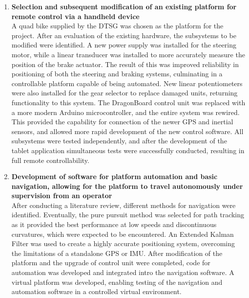 \documentclass[main.tex]{subfiles}
\begin{document}
\begin{enumerate}
\item \textbf{Selection and subsequent modification of an existing platform for remote control via a handheld device}\\ 
A quad bike supplied by the DTSG was chosen as the platform for the project. 
After an evaluation of the existing hardware, the subsystems to be modified were identified. 
A new power supply was installed for the steering motor, while a linear transducer was installed to more accurately measure the position of the brake actuator. 
The result of this was improved reliability in positioning of both the steering and braking systems, culminating in a controllable platform capable of being automated.
New linear potentiometers were also installed for the gear selector to replace damaged units, returning functionality to this system. 
The DragonBoard control unit was replaced with a more modern Arduino microcontroller, and the entire system was rewired. 
This provided the capability for connection of the newer GPS and inertial sensors, and allowed more rapid development of the new control software.
All subsystems were tested independently, and after the development of the tablet application simultaneous tests were successfully conducted, resulting in full remote controllability.

 

\item \textbf{Development of software for platform automation and basic navigation, allowing for the platform to travel autonomously under supervision from an operator}\\ 
After conducting a literature review, different methods for navigation were identified. Eventually, the pure pursuit method was selected for path tracking as it provided the best performance at low speeds and discontinuous curvatures, which were expected to be encountered. An Extended Kalman Filter was used to create a highly accurate positioning system, overcoming the limitations of a standalone GPS or IMU. After modification of the platform and the upgrade of control unit were completed, code for automation was developed and integrated intro the navigation software. A virtual platform was developed, enabling testing of the navigation and automation software in a controlled virtual environment. 


\end{enumerate}
\end{document}
